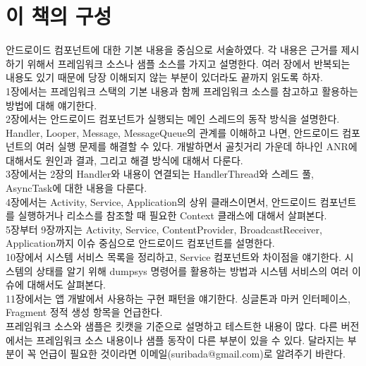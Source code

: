 \begin{comment}
\begin{abstract}
잘 만든 앱은 다 그럭저럭이지만, 그렇지 않은 앱은 제각각의 이유가 있다. 여기서는 그럭저럭한 앱을 만드는 원리와 방법을 찾아보고, 문제를 발생시키는 제각각의 이유에 대해서도 얘기해보자.
\end{abstract}
\end{comment}

\chapter*{이 책의 구성}
안드로이드 컴포넌트에 대한 기본 내용을 중심으로 서술하였다. 각 내용은 근거를 제시하기 위해서 프레임워크 소스나 샘플 소스를 가지고 설명한다.
여러 장에서 반복되는 내용도 있기 때문에 당장 이해되지 않는 부분이 있더라도 끝까지 읽도록 하자.\\

1장에서는 프레임워크 스택의 기본 내용과 함께 프레임워크 소스를 참고하고 활용하는 방법에 대해 얘기한다.\\

2장에서는 안드로이드 컴포넌트가 실행되는 메인 스레드의 동작 방식을 설명한다.
Handler, Looper, Message, MessageQueue의 관계를 이해하고 나면, 안드로이드 컴포넌트의 여러 실행 문제를 해결할 수 있다. 
개발하면서 골칫거리 가운데 하나인 ANR에 대해서도 원인과 결과, 그리고 해결 방식에 대해서 다룬다.\\

3장에서는 2장의 Handler와 내용이 연결되는 HandlerThread와 스레드 풀, AsyncTask에 대한 내용을 다룬다.\\

4장에서는 Activity, Service, Application의 상위 클래스이면서, 안드로이드 컴포넌트를 실행하거나 리소스를 참조할 때 필요한 Context 클래스에 대해서 살펴본다.\\

5장부터 9장까지는 Activity, Service, ContentProvider, BroadcastReceiver, Application까지 이슈 중심으로 안드로이드 컴포넌트를 설명한다.\\

10장에서 시스템 서비스 목록을 정리하고, Service 컴포넌트와 차이점을 얘기한다. 시스템의 상태를 알기 위해 dumpsys 명령어를 활용하는 방법과 시스템 서비스의 여러 이슈에 대해서도 살펴본다.\\

11장에서는 앱 개발에서 사용하는 구현 패턴을 얘기한다. 싱글톤과 마커 인터페이스, Fragment 정적 생성 항목을 언급한다.\\

프레임워크 소스와 샘플은 킷캣을 기준으로 설명하고 테스트한 내용이 많다. 다른 버전에서는 프레임워크 소스 내용이나 샘플 동작이 다른 부분이 있을 수 있다. 달라지는 부분이 꼭 언급이 필요한 것이라면 이메일(suribada@gmail.com)로 알려주기 바란다.

